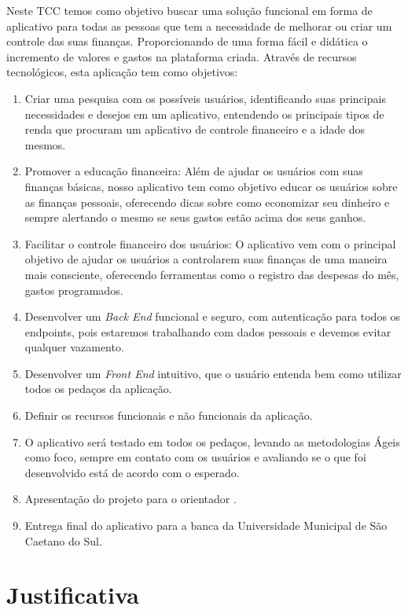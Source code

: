 Neste TCC temos como objetivo buscar uma solução funcional em forma de aplicativo para todas as pessoas que tem a necessidade de melhorar ou criar um controle das suas finanças. Proporcionando de uma forma fácil e didática o incremento de valores e gastos na plataforma criada. Através de recursos tecnológicos, esta aplicação tem como objetivos:
\begin{enumerate}
    \item Criar uma pesquisa com os possíveis usuários, identificando suas principais necessidades e desejos em um aplicativo, entendendo os principais tipos de renda que procuram um aplicativo de controle financeiro e a idade dos mesmos.
    \item Promover a educação financeira: Além de ajudar os usuários com suas finanças básicas, nosso aplicativo tem como objetivo educar os usuários sobre as finanças pessoais, oferecendo dicas sobre como economizar seu dinheiro e sempre alertando o mesmo se seus gastos estão acima dos seus ganhos.
    \item Facilitar o controle financeiro dos usuários: O aplicativo vem com o principal objetivo de ajudar os usuários a controlarem suas finanças de uma maneira mais consciente, oferecendo ferramentas como o registro das despesas do mês, gastos programados.
    \item Desenvolver um \textit{Back End} funcional e seguro, com autenticação para todos os endpoints, pois estaremos trabalhando com dados pessoais e devemos evitar qualquer vazamento.
    \item Desenvolver um \textit{Front End} intuitivo, que o usuário entenda bem como utilizar todos os pedaços da aplicação.
    \item Definir os recursos funcionais e não funcionais da aplicação.
    \item O aplicativo será testado em todos os pedaços, levando as metodologias Ágeis como foco, sempre em contato com os usuários e avaliando se o que foi desenvolvido está de acordo com o esperado.
    \item Apresentação do projeto para o orientador \imprimirorientador.
    \item Entrega final do aplicativo para a banca da Universidade Municipal de São Caetano do Sul.
\end{enumerate}

\section{Justificativa}

